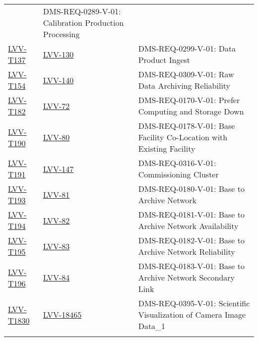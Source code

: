 \begin{longtable}{p{3cm}p{3cm}L{9cm}}
  & DMS-REQ-0289-V-01: Calibration Production Processing
 \\ 
\hline
\href{https://jira.lsstcorp.org/secure/Tests.jspa#/testCase/LVV-T137}{LVV-T137} &
  \href{https://jira.lsstcorp.org/browse/LVV-130}{LVV-130}
  & DMS-REQ-0299-V-01: Data Product Ingest
 \\ 
\hline
\href{https://jira.lsstcorp.org/secure/Tests.jspa#/testCase/LVV-T154}{LVV-T154} &
  \href{https://jira.lsstcorp.org/browse/LVV-140}{LVV-140}
  & DMS-REQ-0309-V-01: Raw Data Archiving Reliability
 \\ 
\hline
\href{https://jira.lsstcorp.org/secure/Tests.jspa#/testCase/LVV-T182}{LVV-T182} &
  \href{https://jira.lsstcorp.org/browse/LVV-72}{LVV-72}
  & DMS-REQ-0170-V-01: Prefer Computing and Storage Down
 \\ 
\hline
\href{https://jira.lsstcorp.org/secure/Tests.jspa#/testCase/LVV-T190}{LVV-T190} &
  \href{https://jira.lsstcorp.org/browse/LVV-80}{LVV-80}
  & DMS-REQ-0178-V-01: Base Facility Co-Location with Existing Facility
 \\ 
\hline
\href{https://jira.lsstcorp.org/secure/Tests.jspa#/testCase/LVV-T191}{LVV-T191} &
  \href{https://jira.lsstcorp.org/browse/LVV-147}{LVV-147}
  & DMS-REQ-0316-V-01: Commissioning Cluster
 \\ 
\hline
\href{https://jira.lsstcorp.org/secure/Tests.jspa#/testCase/LVV-T193}{LVV-T193} &
  \href{https://jira.lsstcorp.org/browse/LVV-81}{LVV-81}
  & DMS-REQ-0180-V-01: Base to Archive Network
 \\ 
\hline
\href{https://jira.lsstcorp.org/secure/Tests.jspa#/testCase/LVV-T194}{LVV-T194} &
  \href{https://jira.lsstcorp.org/browse/LVV-82}{LVV-82}
  & DMS-REQ-0181-V-01: Base to Archive Network Availability
 \\ 
\hline
\href{https://jira.lsstcorp.org/secure/Tests.jspa#/testCase/LVV-T195}{LVV-T195} &
  \href{https://jira.lsstcorp.org/browse/LVV-83}{LVV-83}
  & DMS-REQ-0182-V-01: Base to Archive Network Reliability
 \\ 
\hline
\href{https://jira.lsstcorp.org/secure/Tests.jspa#/testCase/LVV-T196}{LVV-T196} &
  \href{https://jira.lsstcorp.org/browse/LVV-84}{LVV-84}
  & DMS-REQ-0183-V-01: Base to Archive Network Secondary Link
 \\ 
\hline
\href{https://jira.lsstcorp.org/secure/Tests.jspa#/testCase/LVV-T1830}{LVV-T1830} &
  \href{https://jira.lsstcorp.org/browse/LVV-18465}{LVV-18465}
  & DMS-REQ-0395-V-01: Scientific Visualization of Camera Image Data\_1
 \\ 
\hline
\end{longtable}
